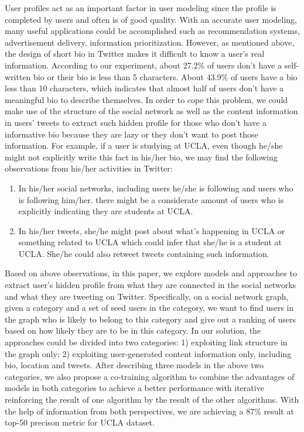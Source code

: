 User profiles act as an important factor in user modeling since the profile is completed by users and often is of good quality. With an accurate user modeling, many useful applications could be accomplished such as recommendation systems, advertisement delivery, information prioritization. However, as mentioned above, the design of short bio in Twitter makes it difficult to know a user's real information. According to our experiment, about 27.2\% of users don't have a self-written bio or their bio is less than 5 characters. About 43.9\% of users have a bio less than 10 characters, which indicates that almost half of users don't have a meaningful bio to describe themselves. In order to cope this problem, we could make use of the structure of the social network as well as the content information in users' tweets to extract such hidden profile for those who don't have a informative bio because they are lazy or they don't want to post those information. For example, if a user is studying at UCLA, even though he/she might not explicitly write this fact in his/her bio, we may find the following observations from his/her activities in Twitter:

\begin{enumerate}

\item In his/her social networks, including users he/she is following and users who is following him/her. there might be a considerate amount of users who is explicitly indicating they are students at UCLA.
\item In his/her tweets, she/he might post about what's happening in UCLA or something related to UCLA which could infer that she/he is a student at UCLA. She/he could also retweet tweets containing such information.

\end{enumerate}

Based on above observations, in this paper, we explore models and approaches to extract user's hidden profile from what they are connected in the social networks and what they are tweeting on Twitter. Specifically, on a social network graph, given a category and a set of seed users in the category, we want to find users in the graph who is likely to belong to this category and give out a ranking of users based on how likely they are to be in this category. In our solution, the approaches could be divided into two categories: 1) exploiting link structure in the graph only; 2) exploiting user-generated content information only, including bio, location and tweets. After describing three models in the above two categories, we also propose a co-training algorithm to combine the advantages of models in both categories to achieve a better performance with iterative reinforcing the result of one algorithm by the result of the other algorithms. With the help of information from both perspectives, we are achieving a 87\%  result at top-50 precison metric for UCLA dataset.


